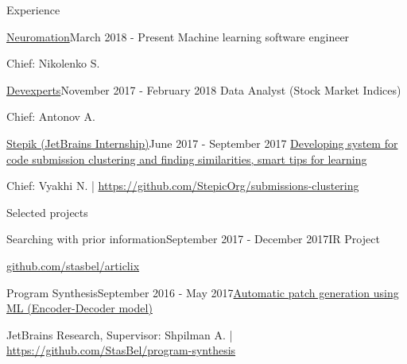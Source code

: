 \documentclass{resume} %
\newcommand{\SKIPSM}{\vspace{-0.7\baselineskip}}
\begin{document}
\begin{rSection}{Experience}

\begin{rSubsection}{\href{http://stepik.org/}{Neuromation}}{March 2018 - Present}
{Machine learning software engineer}{} 
\item[] Chief: Nikolenko S.
\end{rSubsection}

\begin{rSubsection}{\href{http://stepik.org/}{Devexperts}}{November 2017 - February 2018}
{Data Analyst (Stock Market Indices)}{} 
\item[] Chief: Antonov A.
\end{rSubsection}

\begin{rSubsection}{\href{http://stepik.org/}{Stepik (JetBrains Internship)}}{June 2017 - September 2017}
{\href{https://jetbrains.ru/students/internship/themes/again/}{Developing system for code submission clustering and finding similarities, smart tips for learning}}{} 
\item[] Chief: Vyakhi N. | \url{https://github.com/StepicOrg/submissions-clustering}
\end{rSubsection}

\end{rSection} 
\SKIPSM
\begin{rSection}{Selected projects}

\begin{rSubsection}{Searching with prior information}{September 2017 - December 2017}{IR Project}{}
\item[] \url{github.com/stasbel/articlix}
\end{rSubsection}

\begin{rSubsection}{Program Synthesis}{September 2016 - May 2017}{\href{https://docs.google.com/presentation/d/113EFcW8L7p8ickhfMoht8ivOomq2fRPizLtWSH9cSX4/pub?start=false&loop=false&delayms=3000}{Automatic patch generation using ML (Encoder-Decoder model)}}{}
\item[] JetBrains Research, Supervisor: Shpilman A. | \url{https://github.com/StasBel/program-synthesis}
\end{rSubsection}

\end{rSection}
\SKIPSM
\end{document}
